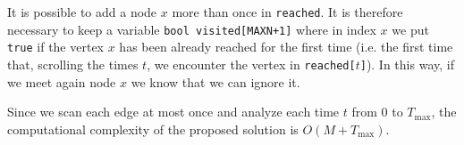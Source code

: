 It is possible to add a node $x$ more than once in \texttt{reached}. It is therefore necessary to keep a variable \texttt{bool visited[MAXN+1]} where in index $x$ we put \texttt{true} if the vertex $x$ has been already reached for the first time (i.e. the first time that, scrolling the times $t$, we encounter the vertex in \texttt{reached[$t$]}). In this way, if we meet again node $x$ we know that we can ignore it.

Since we scan each edge at most once and analyze each time $t$ from $0$ to $T_{\max}$, the computational complexity of the proposed solution is $O(M + T_{\max})$.


\newpage
\CppSolution

%
\colorbox{white}{}

\afterpage{\nopagecolor}
